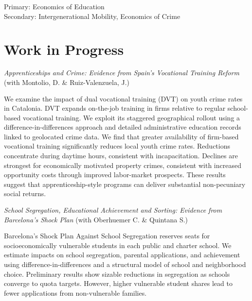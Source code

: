 \documentclass[11pt,a4paper]{article}
\begin{document}
Primary: Economics of Education\\
Secondary: Intergenerational Mobility, Economics of Crime

\section*{Work in Progress}

\begin{minipage}{\linewidth}
\textit{Apprenticeships and Crime: Evidence from Spain's Vocational Training Reform} (with Montolio, D. \& Ruiz-Valenzuela, J.)

\vspace{0.3em}
{\small
We examine the impact of dual vocational training (DVT) on youth crime rates in Catalonia. DVT expands on-the-job training in firms relative to regular school-based vocational training. We exploit its staggered geographical rollout using a difference-in-differences approach and detailed administrative education records linked to geolocated crime data. We find that greater availability of firm-based vocational training significantly reduces local youth crime rates. Reductions concentrate during daytime hours, consistent with incapacitation. Declines are strongest for economically motivated property crimes, consistent with increased opportunity costs through improved labor-market prospects. These results suggest that apprenticeship-style programs can deliver substantial non-pecuniary social returns.\par}
\end{minipage}

\vspace{0.7em}

\begin{minipage}{\linewidth}
\textit{School Segregation, Educational Achievement and Sorting: Evidence from Barcelona's Shock Plan} (with Oberhuemer C. \& Quintana S.)

\vspace{0.3em}
{\small
Barcelona's Shock Plan Against School Segregation reserves seats for socioeconomically vulnerable students in each public and charter school. We estimate impacts on school segregation, parental applications, and achievement using difference-in-differences and a structural model of school and neighborhood choice. Preliminary results show sizable reductions in segregation as schools converge to quota targets. However, higher vulnerable student shares lead to fewer applications from non-vulnerable families.\par}
\end{minipage}
\end{document}
